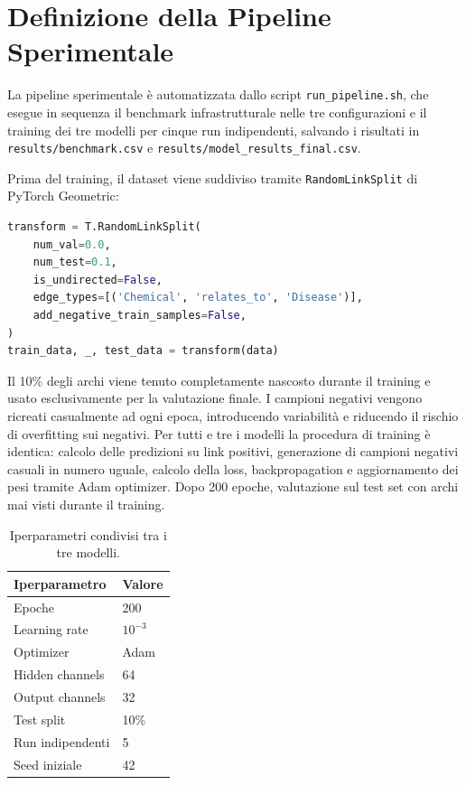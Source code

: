 \section{Definizione della Pipeline Sperimentale}

La pipeline sperimentale è automatizzata dallo script \texttt{run\_pipeline.sh}, che esegue in sequenza il benchmark infrastrutturale nelle tre configurazioni e il training dei tre modelli per cinque run indipendenti, salvando i risultati in \texttt{results/benchmark.csv} e \texttt{results/model\_results\_final.csv}.

Prima del training, il dataset viene suddiviso tramite \texttt{RandomLinkSplit} di PyTorch Geometric:

\begin{lstlisting}[language=Python, caption={Suddivisione training/test con RandomLinkSplit}]
transform = T.RandomLinkSplit(
    num_val=0.0,
    num_test=0.1,
    is_undirected=False,
    edge_types=[('Chemical', 'relates_to', 'Disease')],
    add_negative_train_samples=False,
)
train_data, _, test_data = transform(data)
\end{lstlisting}

Il 10\% degli archi viene tenuto completamente nascosto durante il training e usato esclusivamente per la valutazione finale. I campioni negativi vengono ricreati casualmente ad ogni epoca, introducendo variabilità e riducendo il rischio di overfitting sui negativi. Per tutti e tre i modelli la procedura di training è identica: calcolo delle predizioni su link positivi, generazione di campioni negativi casuali in numero uguale, calcolo della loss, backpropagation e aggiornamento dei pesi tramite Adam optimizer. Dopo 200 epoche, valutazione sul test set con archi mai visti durante il training.

\begin{table}[ht!]
\centering
\small
\begin{tabular}{ll}
\toprule
\textbf{Iperparametro} & \textbf{Valore} \\
\midrule
Epoche             & 200 \\
Learning rate      & $10^{-3}$ \\
Optimizer          & Adam \\
Hidden channels    & 64 \\
Output channels    & 32 \\
Test split         & 10\% \\
Run indipendenti   & 5 \\
Seed iniziale      & 42 \\
\bottomrule
\end{tabular}
\caption{Iperparametri condivisi tra i tre modelli.}
\label{tab:hyperparams}
\end{table}

